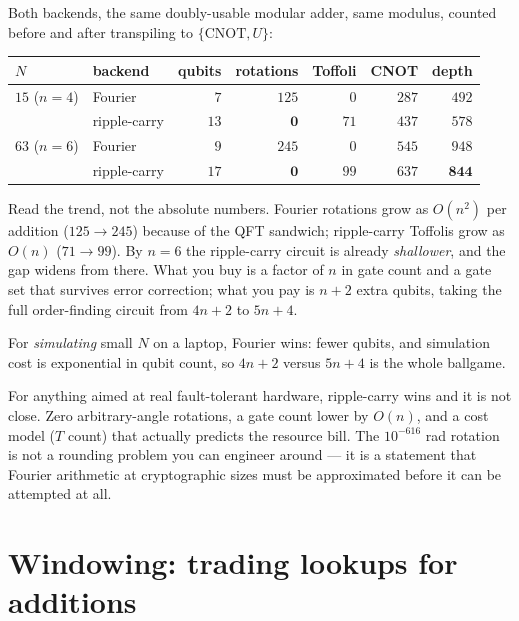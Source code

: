 \documentclass[11pt]{article}
\newcommand{\CNOT}{\mathrm{CNOT}}
\theoremstyle{plain}
\theoremstyle{remark}
\begin{document}
Both backends, the same doubly-usable modular adder, same modulus, counted before and after
transpiling to $\{\CNOT,U\}$:

\begin{center}\small
\begin{tabular}{@{}llrrrrr@{}}
\toprule
$N$ & backend & qubits & rotations & Toffoli & CNOT & depth\\
\midrule
$15$ ($n{=}4$) & Fourier      & $7$  & $125$ & $0$   & $287$ & $492$\\
               & ripple-carry & $13$ & $\mathbf 0$ & $71$ & $437$ & $578$\\
\midrule
$63$ ($n{=}6$) & Fourier      & $9$  & $245$ & $0$   & $545$ & $948$\\
               & ripple-carry & $17$ & $\mathbf 0$ & $99$ & $637$ & $\mathbf{844}$\\
\bottomrule
\end{tabular}
\end{center}

\noindent
Read the trend, not the absolute numbers. Fourier rotations grow as $O(n^2)$ per addition
($125\to245$) because of the QFT sandwich; ripple-carry Toffolis grow as $O(n)$ ($71\to99$). By
$n=6$ the ripple-carry circuit is already \emph{shallower}, and the gap widens from there. What you
buy is a factor of $n$ in gate count and a gate set that survives error correction; what you pay is
$n+2$ extra qubits, taking the full order-finding circuit from $4n+2$ to $5n+4$.

\begin{keybox}[title={Which to use}]
For \emph{simulating} small $N$ on a laptop, Fourier wins: fewer qubits, and simulation cost is
exponential in qubit count, so $4n+2$ versus $5n+4$ is the whole ballgame.

For anything aimed at real fault-tolerant hardware, ripple-carry wins and it is not close. Zero
arbitrary-angle rotations, a gate count lower by $O(n)$, and a cost model ($T$ count) that actually
predicts the resource bill. The $10^{-616}$ rad rotation is not a rounding problem you can engineer
around --- it is a statement that Fourier arithmetic at cryptographic sizes must be approximated
before it can be attempted at all.
\end{keybox}

\section{Windowing: trading lookups for additions}\label{im:sec:window}
\end{document}
